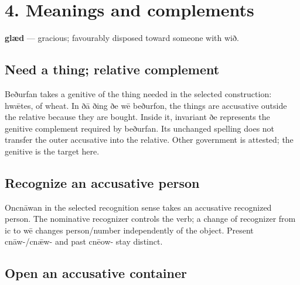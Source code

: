 \section*{4. Meanings and complements}

\textbf{glæd} — gracious; favourably disposed toward someone with wið.

\subsection*{Need a thing; relative complement}

Beðurfan takes a genitive of the thing needed in the selected construction: hwǣtes, of wheat. In ðā ðing ðe wē beðurfon, the things are accusative outside the relative because they are bought. Inside it, invariant ðe represents the genitive complement required by beðurfan. Its unchanged spelling does not transfer the outer accusative into the relative. Other government is attested; the genitive is the target here.

\subsection*{Recognize an accusative person}

Oncnāwan in the selected recognition sense takes an accusative recognized person. The nominative recognizer controls the verb; a change of recognizer from ic to wē changes person/\allowbreak{}number independently of the object. Present cnāw-/\allowbreak{}cnǣw- and past cnēow- stay distinct.

\subsection*{Open an accusative container}

